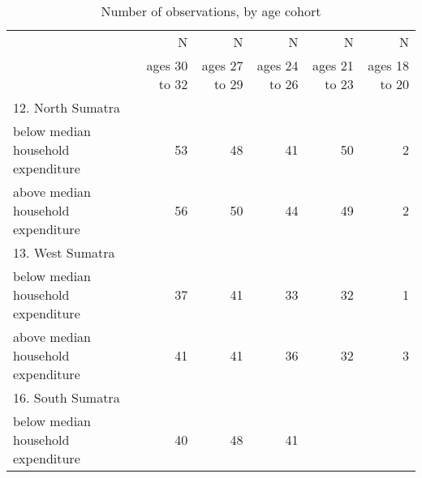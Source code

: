 \begin{table}[!h]
\caption{Number of observations, by age cohort}
\centering
\begin{tabular}{llllll}
\cline{1-6}
\multicolumn{1}{c}{} &
  \multicolumn{1}{|r}{N} &
  \multicolumn{1}{r}{N} &
  \multicolumn{1}{r}{N} &
  \multicolumn{1}{r}{N} &
  \multicolumn{1}{r}{N} \\
\multicolumn{1}{c}{} &
  \multicolumn{1}{|r}{ages 30 to 32} &
  \multicolumn{1}{r}{ages 27 to 29} &
  \multicolumn{1}{r}{ages 24 to 26} &
  \multicolumn{1}{r}{ages 21 to 23} &
  \multicolumn{1}{r}{ages 18 to 20} \\
\cline{1-6}
\multicolumn{1}{l}{12. North Sumatra} &
  \multicolumn{1}{|r}{} &
  \multicolumn{1}{r}{} &
  \multicolumn{1}{r}{} &
  \multicolumn{1}{r}{} &
  \multicolumn{1}{r}{} \\
\multicolumn{1}{l}{\hspace{1em}below median household expenditure} &
  \multicolumn{1}{|r}{53} &
  \multicolumn{1}{r}{48} &
  \multicolumn{1}{r}{41} &
  \multicolumn{1}{r}{50} &
  \multicolumn{1}{r}{2} \\
\multicolumn{1}{l}{\hspace{1em}above median household expenditure} &
  \multicolumn{1}{|r}{56} &
  \multicolumn{1}{r}{50} &
  \multicolumn{1}{r}{44} &
  \multicolumn{1}{r}{49} &
  \multicolumn{1}{r}{2} \\
\multicolumn{1}{l}{13. West Sumatra} &
  \multicolumn{1}{|r}{} &
  \multicolumn{1}{r}{} &
  \multicolumn{1}{r}{} &
  \multicolumn{1}{r}{} &
  \multicolumn{1}{r}{} \\
\multicolumn{1}{l}{\hspace{1em}below median household expenditure} &
  \multicolumn{1}{|r}{37} &
  \multicolumn{1}{r}{41} &
  \multicolumn{1}{r}{33} &
  \multicolumn{1}{r}{32} &
  \multicolumn{1}{r}{1} \\
\multicolumn{1}{l}{\hspace{1em}above median household expenditure} &
  \multicolumn{1}{|r}{41} &
  \multicolumn{1}{r}{41} &
  \multicolumn{1}{r}{36} &
  \multicolumn{1}{r}{32} &
  \multicolumn{1}{r}{3} \\
\multicolumn{1}{l}{16. South Sumatra} &
  \multicolumn{1}{|r}{} &
  \multicolumn{1}{r}{} &
  \multicolumn{1}{r}{} &
  \multicolumn{1}{r}{} &
  \multicolumn{1}{r}{} \\
\multicolumn{1}{l}{\hspace{1em}below median household expenditure} &
  \multicolumn{1}{|r}{40} &
  \multicolumn{1}{r}{48} &
  \multicolumn{1}{r}{41} &

\end{tabular}
\end{table}
